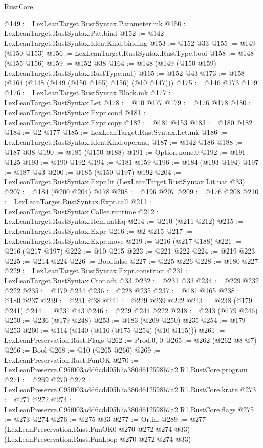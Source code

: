 \begin{lexlean}{RustCore}
\begin{coremodule}
@149 := LexLeanTarget.RustSyntax.Parameter.mk
@150 := LexLeanTarget.RustSyntax.Pat.bind
@152 := @142 LexLeanTarget.RustSyntax.IdentKind.binding
@153 := @152 @33
@155 := @149 (@150 @153)
@156 := LexLeanTarget.RustSyntax.RustType.bool
@158 := @148 (@155 @156)
@159 := @152 @38
@164 := @148 (@149 (@150 @159) LexLeanTarget.RustSyntax.RustType.nat)
@165 := @152 @43
@173 := @158 (@164 (@148 (@149 (@150 @165) @156) (@10 @147)))
@175 := @146 @173 @119
@176 := LexLeanTarget.RustSyntax.Block.mk
@177 := LexLeanTarget.RustSyntax.Let
@178 := @10 @177
@179 := @176 @178
@180 := LexLeanTarget.RustSyntax.Expr.cond
@181 := LexLeanTarget.RustSyntax.Expr.copy
@182 := @181 @153
@183 := @180 @182
@184 := @2 @177
@185 := LexLeanTarget.RustSyntax.Let.mk
@186 := LexLeanTarget.RustSyntax.IdentKind.operand
@187 := @142 @186
@188 := @187 @38
@190 := @185 (@150 @188)
@191 := Option.none.{0}
@192 := @191 @125
@193 := @190 @192
@194 := @181 @159
@196 := @184 (@193 @194)
@197 := @187 @43
@200 := @185 (@150 @197) @192
@204 := LexLeanTarget.RustSyntax.Expr.lit (LexLeanTarget.RustSyntax.Lit.nat @33)
@207 := @184 (@200 @204) @178
@208 := @196 @207
@209 := @176 @208
@210 := LexLeanTarget.RustSyntax.Expr.call
@211 := LexLeanTarget.RustSyntax.Callee.runtime
@212 := LexLeanTarget.RustSyntax.Item.natEq
@214 := @210 (@211 @212)
@215 := LexLeanTarget.RustSyntax.Expr
@216 := @2 @215
@217 := LexLeanTarget.RustSyntax.Expr.move
@219 := @216 (@217 @188)
@221 := @216 (@217 @197)
@222 := @10 @215
@223 := @221 @222
@224 := @219 @223
@225 := @214 @224
@226 := Bool.false
@227 := @225 @226
@228 := @180 @227
@229 := LexLeanTarget.RustSyntax.Expr.construct
@231 := LexLeanTarget.RustSyntax.Ctor.adt @33
@232 := @231 @33
@234 := @229 @232 @222
@235 := @179 @234
@236 := @228 @235
@237 := @181 @165
@238 := @180 @237
@239 := @231 @38
@241 := @229 @239 @222
@243 := @238 (@179 @241)
@244 := @231 @43
@246 := @229 @244 @222
@248 := @243 (@179 @246)
@250 := @236 (@179 @248)
@253 := @183 (@209 @250) @235
@254 := @179 @253
@260 := @114 (@140 (@116 (@175 @254) (@10 @115)))
@261 := LexLeanPreservation.Rust.Flags
@262 := Prod.{0, 0}
@265 := @262 (@262 @8 @7)
@266 := Bool
@268 := @10 (@265 @266)
@269 := LexLeanPreservation.Rust.FunOK
@270 := LexLeanPreserve.C95f003add6cdd05b7a380d612598b7a2.R1.RustCore.program
@271 := @269 @270
@272 := LexLeanPreserve.C95f003add6cdd05b7a380d612598b7a2.R1.RustCore.krate
@273 := @271 @272
@274 := LexLeanPreserve.C95f003add6cdd05b7a380d612598b7a2.R1.RustCore.flags
@275 := @273 @274
@276 := @275 @33
@277 := Or.inl
@289 := @277
    (LexLeanPreservation.Rust.FunOK0 @270 @272 @274 @33)
    (LexLeanPreservation.Rust.FunLoop @270 @272 @274 @33)

\end{coremodule}
\end{lexlean}
